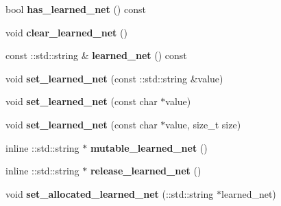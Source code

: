 \begin{DoxyCompactItemize}
\mbox{\label{classcaffe_1_1_solver_state_a7a2ccc860475044abd9115c71abad5fc}} 
bool {\bfseries has\+\_\+learned\+\_\+net} () const
\item 
\mbox{\label{classcaffe_1_1_solver_state_aa8d4816a5b31ab0128eaccbf78a8cb36}} 
void {\bfseries clear\+\_\+learned\+\_\+net} ()
\item 
\mbox{\label{classcaffe_1_1_solver_state_ae4f5db1bd24d2c8b923a912aab9efeab}} 
const \+::std\+::string \& {\bfseries learned\+\_\+net} () const
\item 
\mbox{\label{classcaffe_1_1_solver_state_aae938f0f63693102f0027ec30fa592e3}} 
void {\bfseries set\+\_\+learned\+\_\+net} (const \+::std\+::string \&value)
\item 
\mbox{\label{classcaffe_1_1_solver_state_aa5c11250c1df93aa4f94107ece085b03}} 
void {\bfseries set\+\_\+learned\+\_\+net} (const char $\ast$value)
\item 
\mbox{\label{classcaffe_1_1_solver_state_a55d82f294c937f525af37cbe700bacfe}} 
void {\bfseries set\+\_\+learned\+\_\+net} (const char $\ast$value, size\+\_\+t size)
\item 
\mbox{\label{classcaffe_1_1_solver_state_a9fea504fe8bfae60b34580df1374e830}} 
inline \+::std\+::string $\ast$ {\bfseries mutable\+\_\+learned\+\_\+net} ()
\item 
\mbox{\label{classcaffe_1_1_solver_state_a867118778a3729d49d49738c7fbc149e}} 
inline \+::std\+::string $\ast$ {\bfseries release\+\_\+learned\+\_\+net} ()
\item 
\mbox{\label{classcaffe_1_1_solver_state_a86f38356d11853faeb96d32ab955002d}} 
void {\bfseries set\+\_\+allocated\+\_\+learned\+\_\+net} (\+::std\+::string $\ast$learned\+\_\+net)
\item 
\mbox{\label{classcaffe_1_1_solver_state_a16fc88ec1f35a1ff6be93ec0489383f7}} 

\end{DoxyCompactItemize}
